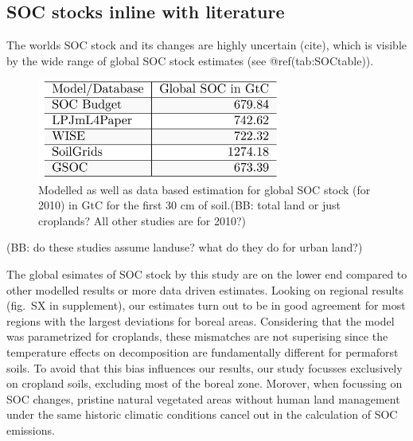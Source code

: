 \documentclass[gc, manuscript]{copernicus}
\begin{document}
\subsection{SOC stocks inline with literature}

The worlds SOC stock and its changes are highly uncertain (cite), which
is visible by the wide range of global SOC stock estimates (see
@ref(tab:SOCtable)).

\begin{figure}[H]
\includegraphics[width=8cm]{../ResultNotebooks/Output/Images/TableSOC_comparison} \caption{Modelled as well as data based estimation for global SOC stock (for 2010) in GtC for the first 30 cm of soil.(BB: total land or just croplands? All other studies are for 2010?)}\label{fig:SOCtable}
\end{figure}

(BB: do these studies assume landuse? what do they do for urban land?)

The global esimates of SOC stock by this study are on the lower end
compared to other modelled results or more data driven estimates.
Looking on regional results (fig.~SX in supplement), our estimates turn
out to be in good agreement for most regions with the largest deviations
for boreal areas. Considering that the model was parametrized for
croplands, these mismatches are not superising since the temperature
effects on decomposition are fundamentally different for
permaforst soils. To avoid that this bias
influences our results, our study focusses exclusively on cropland
soils, excluding most of the boreal zone. Morover, when focussing on SOC
changes, pristine natural vegetated areas without human land management
under the same historic climatic conditions cancel out in the
calculation of SOC emissions.
\end{document}
